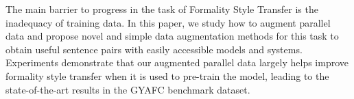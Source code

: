 The main barrier to progress in the task of Formality Style Transfer is the inadequacy of training data. In this paper, we study how to augment parallel data and propose novel and simple data augmentation methods for this task to obtain useful sentence pairs with easily accessible models and systems. Experiments demonstrate that our augmented parallel data largely helps improve formality style transfer when it is used to pre-train the model, leading to the state-of-the-art results in the GYAFC benchmark dataset.
